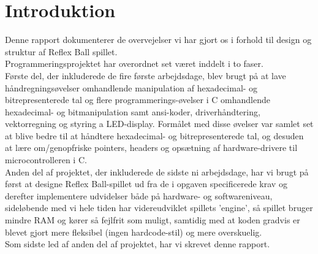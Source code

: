 \chapter{Introduktion}
Denne rapport dokumenterer de overvejelser vi har gjort os i forhold til design og struktur af Reflex Ball spillet. \\
Programmeringsprojektet har overordnet set været inddelt i to faser.\\

Første del, der inkluderede de fire første arbejdsdage, blev brugt på at lave håndregningsøvelser omhandlende manipulation af hexadecimal- og bitrepresenterede tal og flere programmerings-øvelser i C omhandlende hexadecimal- og bitmanipulation samt ansi-koder, driverhåndtering, vektorregning og styring a LED-display. Formålet med disse øvelser var samlet set at blive bedre til at håndtere hexadecimal- og bitrepresenterede tal, og desuden at lære om/genopfriske pointers, headers og opsætning af hardware-drivere til microcontrolleren i C.\\

Anden del af projektet, der inkluderede de sidste ni arbejdsdage, har vi brugt på først at designe Reflex Ball-spillet ud fra de i opgaven specificerede krav og derefter implementere udvidelser både på hardware- og softwareniveau, sideløbende med vi hele tiden har videreudviklet spillets 'engine', så spillet bruger mindre RAM og kører så fejlfrit som muligt, samtidig med at koden gradvis er blevet gjort mere fleksibel (ingen hardcode-stil) og mere overskuelig.\\
Som sidste led af anden del af projektet, har vi skrevet denne rapport.

